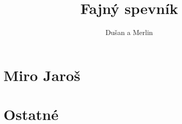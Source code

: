 \documentclass[a4paper]{article}
\title{Fajný spevník}
\author{Dušan a Merlin}
\date{}
\begin{document}
\maketitle
\clearpage
\tableofcontents
\clearpage
\begin{multicols}{3}
\section{Miro Jaroš}
	
	
	
	
	

\section{Ostatné}
	
	

\end{multicols}
\end{document}
